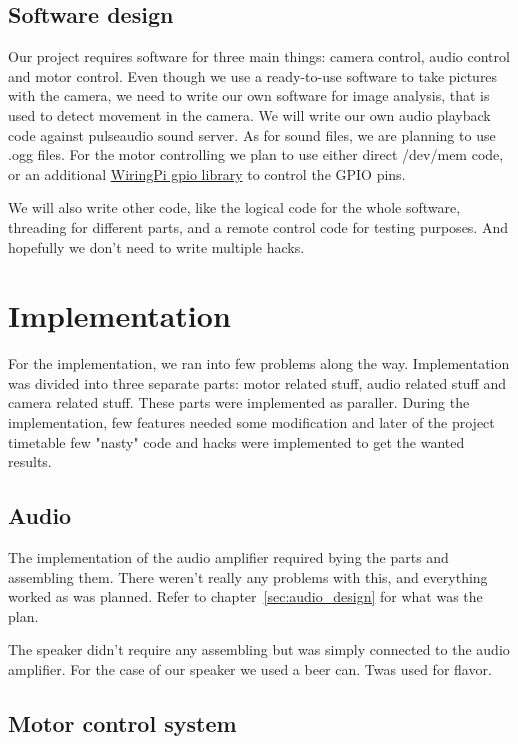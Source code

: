 \documentclass[english,11pt,twoside,a4paper]{article}
\begin{document}
\subsection{Software design}

Our project requires software for three main things: camera control, audio control and motor control. Even though we use a ready-to-use software to take pictures with the camera, we need to write our own software for image analysis, that is used to detect movement in the camera. We will write our own audio playback code against pulseaudio sound server. As for sound files, we are planning to use .ogg files. For the motor controlling we plan to use either direct /dev/mem code, or an additional \href{http://wiringpi.com}{WiringPi gpio library} to control the GPIO pins.

We will also write other code, like the logical code for the whole software, threading for different parts, and a remote control code for testing purposes. And hopefully we don't need to write multiple hacks.

\section{Implementation}

For the implementation, we ran into few problems along the way. Implementation was divided into three separate parts: motor related stuff, audio related stuff and camera related stuff. These parts were implemented as paraller. During the implementation, few features needed some modification and later of the project timetable few "nasty" code and hacks were implemented to get the wanted results.

\subsection{Audio}

The implementation of the audio amplifier required bying the parts and assembling them. There weren't really any problems with this, and everything worked as was planned. Refer to chapter~\ref{sec:audio_design} for what was the plan.

The speaker didn't require any assembling but was simply connected to the audio amplifier. For the case of our speaker we used a beer can. Twas used for flavor.

\subsection{Motor control system}
\end{document}
